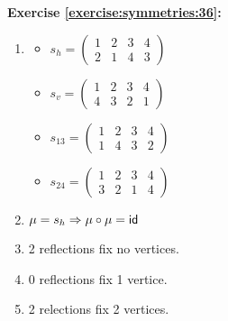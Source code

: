 \noindent\textbf{Exercise \ref{exercise:symmetries:36}:}
\begin{enumerate}[{a.}]
\item
	\begin{multicols}{2}
	\begin{itemize}
	\item
	$s_h =\begin{pmatrix}
	1 & 2 & 3 & 4\\
	2 & 1 & 4 & 3
	\end{pmatrix}$
	
	\item
	$s_v =\begin{pmatrix}
	1 & 2 & 3 & 4\\
	4 & 3 & 2 & 1
	\end{pmatrix}$
	
	\item
	$s_{13} =\begin{pmatrix}
	1 & 2 & 3 & 4\\
	1 & 4 & 3 & 2
	\end{pmatrix}$
	
	\item
	$s_{24} =\begin{pmatrix}
	1 & 2 & 3 & 4\\
	3 & 2 & 1 & 4
	\end{pmatrix}$
	\end{itemize}
	\end{multicols}
	
\item
$\mu = s_h \Rightarrow \mu \circ \mu = \sf{id}$

\item
2 reflections fix no vertices.

\item
0 reflections fix 1 vertice.

\item
2 relections fix 2 vertices.
\end{enumerate}

